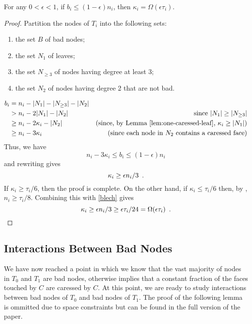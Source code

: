 \documentclass[a4paper,UKenglish]{socg-lipics-v2019}
\begin{document}
\begin{lem}
   For any $0<\epsilon < 1$, if $b_i \le (1-\epsilon)n_i$, then
   $\kappa_i = \Omega(\epsilon\tau_i)$.
\end{lem}

\begin{proof}
   Partition the nodes of $T_i$ into the following sets:
   \begin{enumerate}
       \item the set $B$ of bad nodes;
       \item the set $N_1$ of leaves;
       \item the set $N_{\ge 3}$ of nodes having degree at least 3;
       \item the set $N_2$ of nodes having degree 2 that are not bad.
   \end{enumerate}
   \begin{align*}
     b_i & = n_i - |N_1|- |N_{\ge 3}|-|N_2| \\
	   & > n_i - 2|N_1|-|N_2| & \text{since $|N_1|\ge |N_{\ge 3}|$} \\
         & \ge  n_i - 2\kappa_i -|N_2| 
	   & \text{(since, by \lemref{one-caressed-leaf}, $\kappa_i\ge |N_1|$)} \\
           & \ge  n_i - 3\kappa_i 
           & \text{(since each node in $N_2$ contains a caressed face)}
    \end{align*}
    Thus, we have
    \[
          n_i-3\kappa_i \le b_i \le (1-\epsilon)n_i
    \]
    and rewriting gives 
    \begin{equation}
      \kappa_i \ge \epsilon n_i/3 \enspace . \eqlabel{blech}
    \end{equation}
    If $\kappa_i \ge \tau_i/6$, then the proof is complete.  On the other hand, if $\kappa_i \le \tau_i/6$ then, by , $n_i \ge \tau_i/8$. Combining this with \eqref{blech}  gives
    \[
      \kappa_i \ge \epsilon n_i/3 \ge \epsilon\tau_i/24 = \Omega(\epsilon \tau_i) \enspace . \qedhere
    \]
\end{proof}

\subsection{Interactions Between Bad Nodes}

We have now reached a point in which we know that the vast
majority of nodes in $T_0$ and $T_1$ are bad nodes, otherwise
 implies that a constant fraction of the
faces touched by $C$ are caressed by $C$.  At this point, we are ready
to study interactions between bad nodes of $T_0$ and bad nodes of $T_1$.
The proof of the following lemma is ommitted due to space constraints
but can be found in the full version of the paper.
\end{document}
